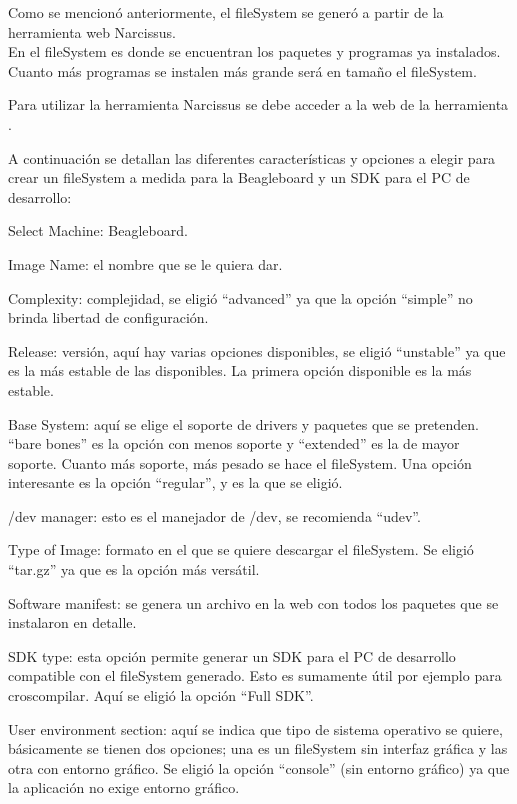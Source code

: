 Como se mencionó anteriormente, el fileSystem se generó a partir de la herramienta web Narcissus.\\
En el fileSystem es donde se encuentran los paquetes y programas ya instalados. Cuanto más programas se instalen más grande será en tamaño el fileSystem.

\bigskip
Para utilizar la herramienta Narcissus se debe acceder a la web de la herramienta \cite{Narc}.

\bigskip
A continuación se detallan las diferentes características y opciones a elegir para crear un fileSystem a medida para la Beagleboard y un SDK para el PC de desarrollo:

\bigskip
Select Machine: Beagleboard.

\bigskip
Image Name: el nombre que se le quiera dar.

\bigskip
Complexity: complejidad, se eligió “advanced” ya que la opción “simple” no brinda libertad de configuración.

\bigskip
Release: versión, aquí hay varias opciones disponibles, se eligió “unstable” ya que es la más estable de las disponibles. La primera opción disponible es la más estable.

\bigskip
Base System: aquí se elige el soporte de drivers y paquetes que se pretenden. “bare bones” es la opción con menos soporte y “extended” es la de mayor soporte. Cuanto más soporte, más pesado se hace el fileSystem. Una opción interesante es la opción “regular”, y es la que se eligió.

\bigskip
/dev manager: esto es el manejador de /dev, se recomienda “udev”.

\bigskip
Type of Image: formato en el que se quiere descargar el fileSystem. Se eligió “tar.gz” ya que es la opción más versátil.

\bigskip
Software manifest: se genera un archivo en la web con todos los paquetes que se instalaron en detalle.

\bigskip
SDK type: esta opción permite generar un SDK para el PC de desarrollo compatible con el fileSystem generado. Esto es sumamente útil por ejemplo para croscompilar. Aquí se eligió la opción “Full SDK”.

\bigskip
User environment section: aquí se indica que tipo de sistema operativo se quiere, básicamente se tienen dos opciones; una es un fileSystem sin interfaz gráfica y las otra con entorno gráfico. Se eligió la opción “console” (sin entorno gráfico) ya que la aplicación no exige entorno gráfico.

